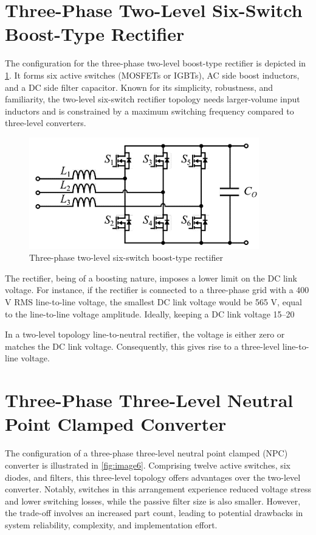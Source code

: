 \documentclass[12pt,a4paper]{book}
\begin{document}
\section{Three-Phase Two-Level Six-Switch Boost-Type Rectifier}
The configuration for the three-phase two-level boost-type rectifier is depicted in \ref{fig:image5}. It forms six active switches (MOSFETs or IGBTs), AC side boost inductors, and a DC side filter capacitor. Known for its simplicity, robustness, and familiarity, the two-level six-switch rectifier topology needs larger-volume input inductors and is constrained by a maximum switching frequency compared to three-level converters.

\begin{figure}[h]
  \centering
  \includegraphics[width=10cm]{image5.png}
  \caption{Three-phase two-level six-switch boost-type rectifier}
  \label{fig:image5}
\end{figure}

The rectifier, being of a boosting nature, imposes a lower limit on the DC link voltage. For instance, if the rectifier is connected to a three-phase grid with a 400 V RMS line-to-line voltage, the smallest DC link voltage would be 565 V, equal to the line-to-line voltage amplitude. Ideally, keeping a DC link voltage 15–20%

In a two-level topology line-to-neutral rectifier, the voltage is either zero or matches the DC link voltage. Consequently, this gives rise to a three-level line-to-line voltage.

\section{Three-Phase Three-Level Neutral Point Clamped Converter }
The configuration of a three-phase three-level neutral point clamped (NPC) converter is illustrated in \ref{fig:image6}. Comprising twelve active switches, six diodes, and filters, this three-level topology offers advantages over the two-level converter. Notably, switches in this arrangement experience reduced voltage stress and lower switching losses, while the passive filter size is also smaller. However, the trade-off involves an increased part count, leading to potential drawbacks in system reliability, complexity, and implementation effort.
\end{document}
